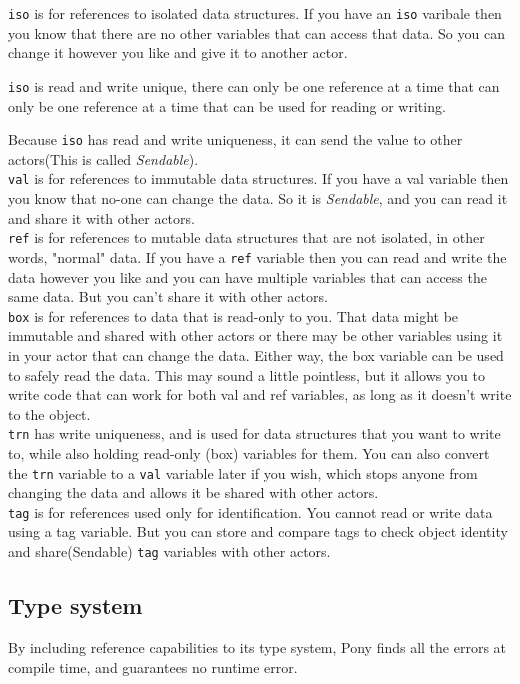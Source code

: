 \documentclass{article}
\begin{document}
\begin{multicols}{2}
\texttt{iso} is for references to isolated data structures. If you have an \texttt{iso} varibale then you know that there are no other variables that can access that data. So you can change it however you like and give it to another actor. 

\texttt{iso} is read and write unique, there can only be one reference at a time that can only be one reference at a time that can be used for reading or writing.

Because \texttt{iso} has read and write uniqueness, it can send the value to other actors(This is called \textit{Sendable}).\\

\texttt{val} is for references to immutable data structures. If you have a val variable then you know that no-one can change the data. So it is \textit{Sendable}, and you can read it and share it with other actors.\\


\texttt{ref} is for references to mutable data structures that are not isolated, in other words, "normal" data. If you have a \texttt{ref} variable then you can read and write the data however you like and you can have multiple variables that can access the same data. But you can't share it with other actors.\\

\texttt{box} is for references to data that is read-only to you. That data might be immutable and shared with other actors or there may be other variables using it in your actor that can change the data. Either way, the box variable can be used to safely read the data. This may sound a little pointless, but it allows you to write code that can work for both val and ref variables, as long as it doesn't write to the object.\\

\texttt{trn} has write uniqueness, and is used for data structures that you want to write to, while also holding read-only (box) variables for them. You can also convert the \texttt{trn} variable to a \texttt{val} variable later if you wish, which stops anyone from changing the data and allows it be shared with other actors. \\

\texttt{tag} is for references used only for identification. You cannot read or write data using a tag variable. But you can store and compare tags to check object identity and share(Sendable) \texttt{tag} variables with other actors.

\subsection{Type system}
By including reference capabilities to its type system, Pony finds all the errors at compile time, and guarantees no runtime error.


\end{multicols}
\end{document}
